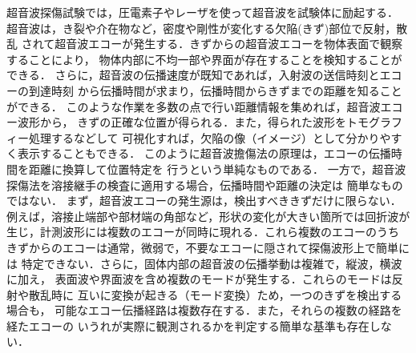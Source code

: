 %
%
超音波探傷試験では，圧電素子やレーザを使って超音波を試験体に励起する．
超音波は，き裂や介在物など，密度や剛性が変化する欠陥(きず)部位で反射，散乱
されて超音波エコーが発生する．きずからの超音波エコーを物体表面で観察することにより，
物体内部に不均一部や界面が存在することを検知することができる．
さらに，超音波の伝播速度が既知であれば，入射波の送信時刻とエコーの到達時刻
から伝播時間が求まり，伝播時間からきずまでの距離を知ることができる．
このような作業を多数の点で行い距離情報を集めれば，超音波エコー波形から，
きずの正確な位置が得られる．また，得られた波形をトモグラフィー処理するなどして
可視化すれば，欠陥の像（イメージ）として分かりやすく表示することもできる．
このように超音波擔傷法の原理は，エコーの伝播時間を距離に換算して位置特定を
行うという単純なものである\cite{US}．
一方で，超音波探傷法を溶接継手の検査に適用する場合，伝播時間や距離の決定は
簡単なものではない．
まず，超音波エコーの発生源は，検出すべききずだけに限らない．
例えば，溶接止端部や部材端の角部など，形状の変化が大きい箇所では回折波が
生じ，計測波形には複数のエコーが同時に現れる\cite{JDA}．これら複数のエコーのうち
きずからのエコーは通常，微弱で，不要なエコーに隠されて探傷波形上で簡単には
特定できない．さらに，固体内部の超音波の伝播挙動は複雑で，縦波，横波に加え，
表面波や界面波を含め複数のモードが発生する．これらのモードは反射や散乱時に
互いに変換が起きる（モード変換）ため，一つのきずを検出する場合も，
可能なエコー伝播経路は複数存在する．また，それらの複数の経路を経たエコーの
いうれが実際に観測されるかを判定する簡単な基準も存在しない．\\


